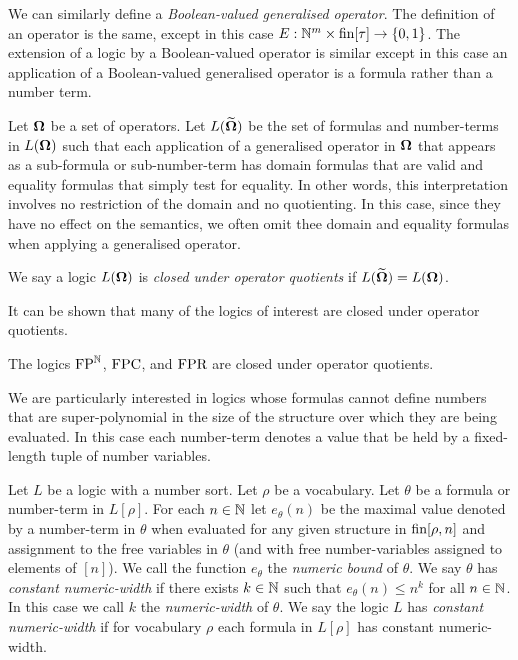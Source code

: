 \documentclass[../main/thesis.tex]{subfiles}
\begin{document}
We can similarly define a \emph{Boolean-valued generalised operator}. The
definition of an operator is the same, except in this case $E : \mathbb{N}^{m} \times
\text{\upshape fin}[\tau] \rightarrow \{0,1\}$. The extension of a logic by a Boolean-valued operator
is similar except in this case an application of a Boolean-valued generalised
operator is a formula rather than a number term.

Let $\mathbf{\mathbf{\Omega}}$ be a set of operators. Let $L(\widetilde{\mathbf{\mathbf{\Omega}}})$ be the set of
formulas and number-terms in $L(\mathbf{\mathbf{\Omega}})$ such that each application of a
generalised operator in $\mathbf{\mathbf{\Omega}}$ that appears as a sub-formula or
sub-number-term has domain formulas that are valid and equality formulas that
simply test for equality. In other words, this interpretation involves no
restriction of the domain and no quotienting. In this case, since they have no
effect on the semantics, we often omit thee domain and equality formulas when
applying a generalised operator.

\begin{definition}
  We say a logic $L(\mathbf{\mathbf{\Omega}})$ is \emph{closed under operator quotients} if
  $L(\widetilde{\mathbf{\mathbf{\Omega}}}) = L(\mathbf{\mathbf{\Omega}})$.
\end{definition}

It can be shown that many of the logics of interest are closed under operator
quotients.

\begin{lem}
  The logics $\text{\upshape FP}^{\mathbb{N}}$, $\text{\upshape FPC}$, and $\text{\upshape FPR}$ are closed under operator
  quotients.
  \label{lem:logics-operator-quotients}
\end{lem}
We are particularly interested in logics whose formulas cannot define numbers
that are super-polynomial in the size of the structure over which they are being
evaluated. In this case each number-term denotes a value that be held by a
fixed-length tuple of number variables.
\begin{definition}
  Let $L$ be a logic with a number sort. Let $\rho$ be a vocabulary. Let
  $\theta$ be a formula or number-term in $L[\rho]$. For each $n \in \mathbb{N}$ let
  $e_{\theta}(n)$ be the maximal value denoted by a number-term in $\theta$ when
  evaluated for any given structure in $\text{\upshape fin}[\rho, n]$ and assignment to the
  free variables in $\theta$ (and with free number-variables assigned to
  elements of $[n]$). We call the function $e_{\theta}$ the \emph{numeric bound}
  of $\theta$. We say $\theta$ has \emph{constant numeric-width} if there exists
  $k \in \mathbb{N}$ such that $e_{\theta}(n) \leq n^k$ for all $n \in \mathbb{N}$. In
  this case we call $k$ the \emph{numeric-width} of $\theta$. We say the logic
  $L$ has \emph{constant numeric-width} if for vocabulary $\rho$ each formula in
  $L[\rho]$ has constant numeric-width.
\end{definition}
\end{document}
